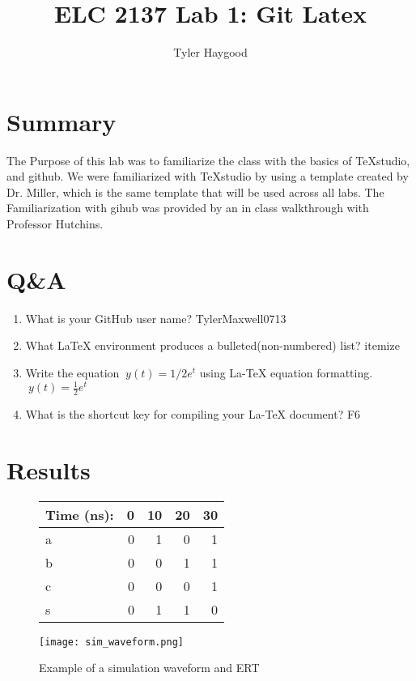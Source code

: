 \documentclass[]{report}
\begin{document}
	\title{ELC 2137 Lab 1: Git Latex}
	\author{Tyler Haygood}
	
	\maketitle
	\section*{Summary}
		The Purpose of this lab was to familiarize the class with the basics of TeXstudio, and github.
		We were familiarized with TeXstudio by using a template created by Dr. Miller,
		which is the same template that will be used across all labs. The Familiarization with gihub was 
		provided by an in class walkthrough with Professor Hutchins.
	
	\section*{Q\&A}
	
	\begin{enumerate}
		\item What is your GitHub user name? \newline
		TylerMaxwell0713 \newline
		\item What LaTeX environment produces a bulleted(non-numbered) list? \newline
		itemize \newline
		\item Write the equation $\ y(t) = 1/2 e^t $ using La-TeX equation formatting. \newline
		$\ y(t) = \frac{1}{2} e^t $ \newline
		\item What is the shortcut key for compiling your La-TeX document? \newline
		F6 \newline
	\end{enumerate}

	\section*{Results}
	
	\begin{figure}[ht]\centering
			\begin{tabular}{l|rrrr}
				Time (ns): & 0 & 10 & 20 & 30 \\
				\midrule
				a & 0 & 1 & 0 & 1 \\
				b & 0 & 0 & 1 & 1 \\
				\midrule
				c & 0 & 0 & 0 & 1 \\
				s & 0 & 1 & 1 & 0 \\
				\bottomrule
			\end{tabular}\medskip
		\newline
		\texttt{[image: sim\_waveform.png]}
		\caption{Example of a simulation waveform and ERT}
		\label{fig:sim_with_table}
	\end{figure}
	
\end{document}
